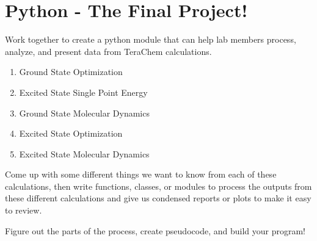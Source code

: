 \section{Python - The Final Project!}

Work together to create a python module that can help lab members
process, analyze, and present data from TeraChem calculations.

\begin{enumerate}
\def\labelenumi{\arabic{enumi}.}
\tightlist
\item
  Ground State Optimization
\item
  Excited State Single Point Energy
\item
  Ground State Molecular Dynamics
\item
  Excited State Optimization
\item
  Excited State Molecular Dynamics
\end{enumerate}

Come up with some different things we want to know from each of these
calculations, then write functions, classes, or modules to process the
outputs from these different calculations and give us condensed reports
or plots to make it easy to review.

Figure out the parts of the process, create pseudocode, and build your
program!

